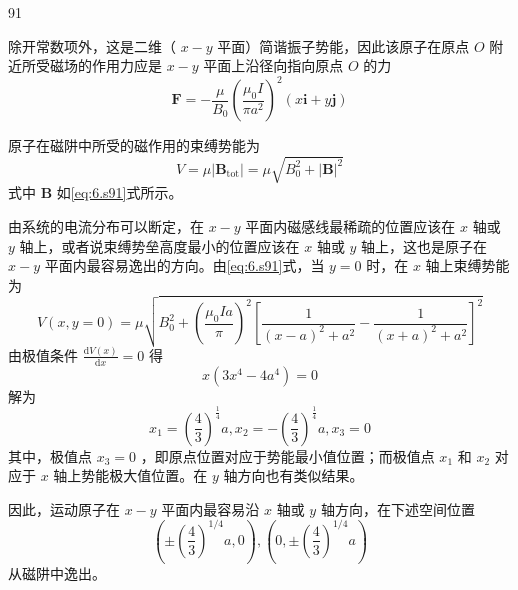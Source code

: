 \begin{solution}{91}
\begin{subsolution}
\begin{equation}
\label{eq:15.s91}
\end{equation}
除开常数项外，这是二维（ $x-y$ 平面）简谐振子势能，因此该原子在原点 $O$ 附近所受磁场的作用力应是 $x-y$ 平面上沿径向指向原点 $O$ 的力
\begin{equation}
\boldsymbol {F} = - \frac {\mu}{B _ {0}} \left(\frac {\mu_ {0} I}{\pi a ^ {2}}\right) ^ {2} (x \boldsymbol {i} + y \boldsymbol {j})
\label{eq:16.s91}
\end{equation}
\end{subsolution}
\begin{subsolution}
原子在磁阱中所受的磁作用的束缚势能为
\begin{equation}
V = \mu | \boldsymbol {B} _ {\mathrm{tot}} | = \mu \sqrt {B _ {0} ^ {2} + | \boldsymbol {B} | ^ {2}}
\label{eq:17.s91}
\end{equation}
式中 $\boldsymbol{B}$ 如\eqref{eq:6.s91}式所示。

由系统的电流分布可以断定，在 $x-y$ 平面内磁感线最稀疏的位置应该在 $x$ 轴或 $y$ 轴上，或者说束缚势垒高度最小的位置应该在 $x$ 轴或 $y$ 轴上，这也是原子在 $x-y$ 平面内最容易逸出的方向。由\eqref{eq:6.s91}式，当 $y=0$ 时，在 $x$ 轴上束缚势能为
\begin{equation}
V (x, y = 0) = \mu \sqrt {B _ {0} ^ {2} + \left(\frac {\mu_ {0} I a}{\pi}\right) ^ {2} \left[ \frac {1}{(x - a) ^ {2} + a ^ {2}} - \frac {1}{(x + a) ^ {2} + a ^ {2}} \right] ^ {2}}
\label{eq:18.s91}
\end{equation}
由极值条件 $\frac{\mathrm{d}V(x)}{\mathrm{d}x} = 0$ 得
\begin{equation}
x \left(3 x ^ {4} - 4 a ^ {4}\right) = 0
\label{eq:19.s91}
\end{equation}
解为
\begin{equation}
x _ {1} = \left(\frac {4}{3}\right) ^ {\frac {1}{4}} a, x _ {2} = - \left(\frac {4}{3}\right) ^ {\frac {1}{4}} a, x _ {3} = 0
\label{eq:20.s91}
\end{equation}
其中，极值点 $x_{3}=0$ ，即原点位置对应于势能最小值位置；而极值点 $x_{1}$ 和 $x_{2}$ 对应于 $x$ 轴上势能极大值位置。在 $y$ 轴方向也有类似结果。

因此，运动原子在 $x-y$ 平面内最容易沿 $x$ 轴或 $y$ 轴方向，在下述空间位置
\begin{equation}
(\pm \left(\frac {4}{3}\right) ^ {1 / 4} a, 0), (0, \pm \left(\frac {4}{3}\right) ^ {1 / 4} a)
\label{eq:21.s91}
\end{equation}
从磁阱中逸出。


\end{subsolution}
\end{solution}
